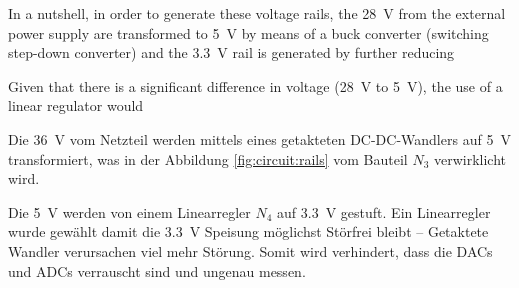 In a nutshell, in order to generate these voltage rails, the \SI{28}{\volt} from the
external power  supply  are  transformed  to  \SI{5}{\volt} by means of a buck
converter (switching step-down converter) and the \SI{3.3}{\volt} rail is generated by further reducing

Given that there is a significant difference in voltage (\SI{28}{\volt} to \SI{5}{\volt}), the use of a linear regulator would

Die  \SI{36}{\volt} vom Netzteil werden mittels eines getakteten  DC-DC-Wandlers
auf \SI{5}{\volt} transformiert,  was  in  der Abbildung \ref{fig:circuit:rails}
vom Bauteil $N_3$ verwirklicht wird.

Die  \SI{5}{\volt}  werden  von  einem  Linearregler  $N_4$ auf  \SI{3.3}{\volt}
gestuft. Ein Linearregler wurde  gew\"ahlt  damit  die  \SI{3.3}{\volt} Speisung
m\"oglichst  St\"orfrei  bleibt  --  Getaktete  Wandler  verursachen  viel  mehr
St\"orung. Somit  wird  verhindert,  dass  die DACs und ADCs verrauscht sind und
ungenau messen.

